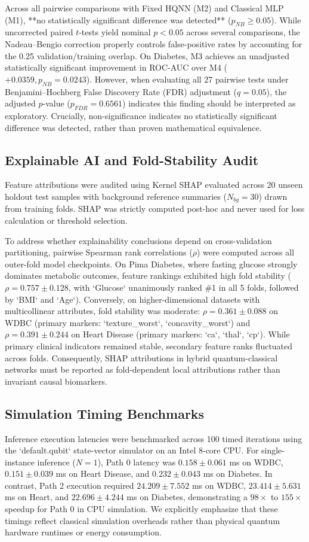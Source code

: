 \documentclass[conference]{IEEEtran}
\begin{document}
Across all pairwise comparisons with Fixed HQNN (M2) and Classical MLP (M1), **no statistically significant difference was detected** ($p_{NB} \ge 0.05$). While uncorrected paired $t$-tests yield nominal $p < 0.05$ across several comparisons, the Nadeau--Bengio correction properly controls false-positive rates by accounting for the 0.25 validation/training overlap. On Diabetes, M3 achieves an unadjusted statistically significant improvement in ROC-AUC over M4 ($+0.0359, p_{NB} = 0.0243$). However, when evaluating all 27 pairwise tests under Benjamini--Hochberg False Discovery Rate (FDR) adjustment ($q=0.05$), the adjusted $p$-value ($p_{FDR} = 0.6561$) indicates this finding should be interpreted as exploratory. Crucially, non-significance indicates no statistically significant difference was detected, rather than proven mathematical equivalence.

\subsection{Explainable AI and Fold-Stability Audit}
Feature attributions were audited using Kernel SHAP \cite{lundberg2017unified} evaluated across 20 unseen holdout test samples with background reference summaries ($N_{bg}=30$) drawn from training folds. SHAP was strictly computed post-hoc and never used for loss calculation or threshold selection.

To address whether explainability conclusions depend on cross-validation partitioning, pairwise Spearman rank correlations ($\rho$) were computed across all outer-fold model checkpoints. On Pima Diabetes, where fasting glucose strongly dominates metabolic outcomes, feature rankings exhibited high fold stability ($\rho = 0.757 \pm 0.128$, with `Glucose` unanimously ranked \#1 in all 5 folds, followed by `BMI` and `Age`). Conversely, on higher-dimensional datasets with multicollinear attributes, fold stability was moderate: $\rho = 0.361 \pm 0.088$ on WDBC (primary markers: `texture_worst`, `concavity_worst`) and $\rho = 0.391 \pm 0.244$ on Heart Disease (primary markers: `ca`, `thal`, `cp`). While primary clinical indicators remained stable, secondary feature ranks fluctuated across folds. Consequently, SHAP attributions in hybrid quantum-classical networks must be reported as fold-dependent local attributions rather than invariant causal biomarkers.

\subsection{Simulation Timing Benchmarks}
Inference execution latencies were benchmarked across 100 timed iterations using the `default.qubit` state-vector simulator on an Intel 8-core CPU. For single-instance inference ($N=1$), Path 0 latency was $0.158 \pm 0.061$ ms on WDBC, $0.151 \pm 0.039$ ms on Heart Disease, and $0.232 \pm 0.043$ ms on Diabetes. In contrast, Path 2 execution required $24.209 \pm 7.552$ ms on WDBC, $23.414 \pm 5.631$ ms on Heart, and $22.696 \pm 4.244$ ms on Diabetes, demonstrating a $98\times$ to $155\times$ speedup for Path 0 in CPU simulation. We explicitly emphasize that these timings reflect classical simulation overheads rather than physical quantum hardware runtimes or energy consumption.
\end{document}
